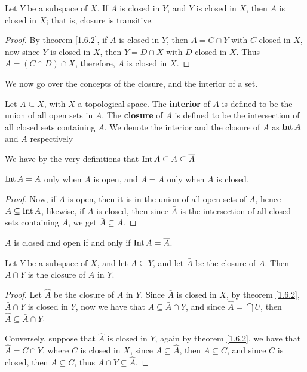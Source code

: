 \begin{theorem}\label{1.6.3}
    Let $Y$ be a subspace of  $X$. If  $A$ is closed in  $Y$, and  $Y$ is closed
    in  $X$, then  $A$ is closed in  $X$; that is, closure is transitive.
\end{theorem}
\begin{proof}
    By theorem \ref{1.6.2}, if $A$ is closed in  $Y$, then  $A=C \cap Y$ with
    $C$ closed in  $X$, now since  $Y$ is closed in  $X$, then  $Y=D \cap X$
    with  $D$ closed in  $X$. Thus  $A=(C \cap D) \cap X$, therefore,  $A$ is
    closed in  $X$.		
\end{proof}

We now go over the concepts of the closure, and the interior of a set.

\begin{definition}
    Let $A \subseteq X$, with  $X$ a topological space. The  \textbf{interior}
    of $A$ is defined to be the union of all open sets in  $A$. The
    \textbf{closure} of $A$ is defined to be the intersection of all closed sets
    containing $A$. We denote the interior and the closure of  $A$ as  $\operatorname{Int}{A}$
    and  $\bar{A}$ respectively
\end{definition}

We have by the very definitions that $\operatorname{Int}{A} \subseteq A \subseteq \overline{A}$

\begin{lemma}\label{1.6.4}
    $\operatorname{Int}{A}=A$ only when  $A$ is open, and  $\bar{A}=A$ only when  $A$ is
    closed.
\end{lemma}
\begin{proof}
    Now, if $A$ is open, then it is in the union of all open sets of  $A$, hence
    $A \subseteq \operatorname{Int}{A}$, likewise, if  $A$ is closed, then since $\bar{A}$ is
    the intersection of all closed sets containing  $A$, we get $\bar{A}
    \subseteq A$.
\end{proof}
\begin{corollary}
    $A$ is closed and open if and only if  $\operatorname{Int}{A}=\overline{A}$.
\end{corollary}

\begin{theorem}\label{1.6.5}
    Let $Y$ be a subspace of  $X$, and let  $A \subseteq Y$, and let $\bar{A}$
    be the closure of $A$. Then  $\bar{A} \cap Y$ is the closure of  $A$ in
    $Y$.
\end{theorem}
\begin{proof}
    Let $\hat{A}$ be the closure of  $A$ in  $Y$. Since  $\bar{A}$ is closed in
    $X$, by theorem \ref{1.6.2},  $\bar{A} \cap Y$ is closed in  $Y$, now we
    have that $A \subseteq \bar{A} \cap Y$, and since $\hat{A}=\bigcap{U}$, then
    $\hat{A} \subseteq \bar{A} \cap Y$.

    Conversely, suppose that $\hat{A}$ is closed in  $Y$, again by theorem
    \ref{1.6.2}, we have that  $\hat{A}=C \cap Y$, where  $C$ is closed in  $X$,
    since  $A \subseteq \hat{A}$, then  $A \subseteq C$, and since  $C$ is
    closed, then  $\bar{A} \subseteq C$, thus  $\bar{A} \cap Y \subseteq
    \hat{A}$.
\end{proof}

